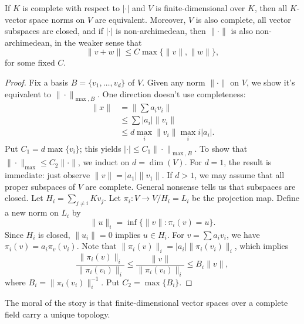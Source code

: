 \begin{theorem}\label{thm:unique-norm-vect}
If $K$ is complete with respect to $|\cdot|$ and $V$ is finite-dimensional over 
$K$, then all $K$-vector space norms on $V$ are equivalent. Moreover, $V$ is 
also complete, all vector subspaces are closed, and if $|\cdot|$ is 
non-archimedean, then $\|\cdot\|$ is also non-archimedean, in the weaker sense 
that 
\[
  \|v+w\| \leqslant C\max\{\|v\|,\|w\|\} ,
\]
for some fixed $C$. 
\end{theorem}
\begin{proof}
Fix a basis $B=\{v_1,\dots,v_d\}$ of $V$. Given any norm $\|\cdot\|$ on $V$, we 
show it's equivalent to $\|\cdot\|_{\max,B}$. One direction doesn't use 
completeness: 
\begin{align*}
  \|x\| 
    &= \left\|\sum a_i v_i\right\| \\
    &\leqslant \sum |a_i| \|v_i\| \\
    &\leqslant d \max_i \|v_i\| \max_ii |a_i| .
\end{align*}
Put $C_1=d \max\{v_i\}$; this yields 
$|\cdot|\leqslant C_1 \|\cdot\|_{\max,B}$. To show that 
$\|\cdot\|_{\max}\leqslant C_2\|\cdot\|$, we induct on $d=\dim(V)$. For $d=1$, 
the result is immediate: just observe $\|v\|=|a_1|\|v_1\|$. 
If $d>1$, we may assume that all proper subspaces of $V$ are complete. General 
nonsense tells us that subspaces are closed. Let $H_i=\sum_{j\ne i} K v_j$. 
Let $\pi_i\colon V\to V/H_i = L_i$ be the projection map. Define a new norm on $L_i$ 
by 
\[
  \|u\|_i = \inf\{\|v\|\colon \pi_i(v)=u\} .
\]
Since $H_i$ is closed, $\|u_i\|=0$ implies $u\in H_i$. For $v=\sum a_i v_i$, 
we have $\pi_i(v)=a_i \pi_v(v_i)$. Note that 
$\|\pi_i(v)\|_i = |a_i| \|\pi_i(v_i)\|_i$, which implies 
\[
  \frac{\|\pi_i(v)\|_i}{\|\pi_i(v_i)\|_i} \leqslant \frac{\|v\|}{\|\pi_i(v_i)\|_i} \leqslant B_i \|v\| ,
\]
where $B_i=\|\pi_i(v_i)\|_i^{-1}$. Put $C_2=\max\{B_i\}$. 
\end{proof}

The moral of the story is that finite-dimensional vector spaces over a complete 
field carry a unique topology. 

